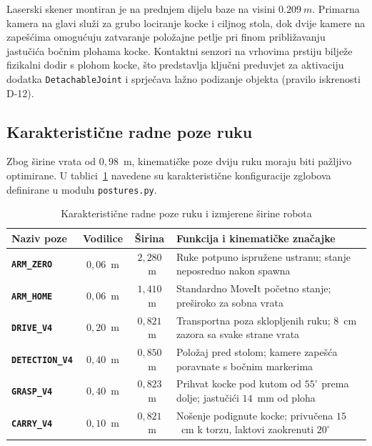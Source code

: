 Laserski skener montiran je na prednjem dijelu baze na visini $\SI{0.209}{m}$. Primarna kamera na glavi
služi za grubo lociranje kocke i ciljnog stola, dok dvije kamere na zapešćima omogućuju zatvaranje
položajne petlje pri finom približavanju jastučića bočnim plohama kocke. Kontaktni senzori na
vrhovima prstiju bilježe fizikalni dodir s plohom kocke, što predstavlja ključni preduvjet za
aktivaciju dodatka \texttt{DetachableJoint} i sprječava lažno podizanje objekta (pravilo iskrenosti
D-12).

\subsection{Karakteristične radne poze ruku}
\label{sec:03-poze}

Zbog širine vrata od $0{,}98$~m, kinematičke poze dviju ruku moraju biti pažljivo optimirane.
U tablici~\ref{tab:poze} navedene su karakteristične konfiguracije zglobova definirane u modulu
\texttt{postures.py}.

\begin{table}[H]
  \centering
  \scriptsize
  \caption{Karakteristične radne poze ruku i izmjerene širine robota}
  \label{tab:poze}
  \begin{tabularx}{\textwidth}{@{}>{\bfseries}p{2.5cm}cc>{\raggedright\arraybackslash}X@{}}
    \toprule
    Naziv poze & Vodilice & Širina & Funkcija i kinematičke značajke \\
    \midrule
    \texttt{ARM\_ZERO} & $0{,}06$~m & $2{,}280$~m & Ruke potpuno ispružene ustranu; stanje neposredno nakon spawna \\
    \texttt{ARM\_HOME} & $0{,}06$~m & $1{,}410$~m & Standardno MoveIt početno stanje; preširoko za sobna vrata \\
    \texttt{DRIVE\_V4} & $0{,}20$~m & $0{,}821$~m & Transportna poza sklopljenih ruku; $8$~cm zazora sa svake strane vrata \\
    \texttt{DETECTION\_V4} & $0{,}40$~m & $0{,}850$~m & Položaj pred stolom; kamere zapešća poravnate s bočnim markerima \\
    \texttt{GRASP\_V4} & $0{,}40$~m & $0{,}823$~m & Prihvat kocke pod kutom od $55^\circ$ prema dolje; jastučići $14$~mm od ploha \\
    \texttt{CARRY\_V4} & $0{,}10$~m & $0{,}821$~m & Nošenje podignute kocke; privučena $15$~cm k torzu, laktovi zaokrenuti $20^\circ$ \\
    \bottomrule
  \end{tabularx}
\end{table}

